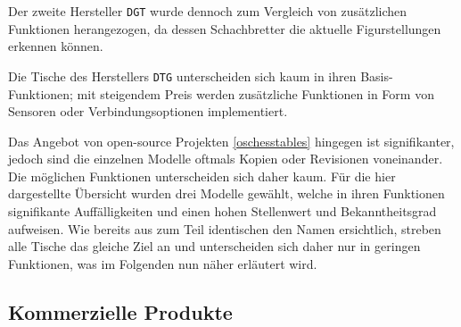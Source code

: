 Der zweite Hersteller \passthrough{\lstinline!DGT!} wurde dennoch zum
Vergleich von zusätzlichen Funktionen herangezogen, da dessen
Schachbretter die aktuelle Figurstellungen erkennen können.

Die Tische des Herstellers \passthrough{\lstinline!DTG!} unterscheiden
sich kaum in ihren Basis-Funktionen; mit steigendem Preis werden
zusätzliche Funktionen in Form von Sensoren oder Verbindungsoptionen
implementiert.

Das Angebot von open-source Projekten \ref{oschesstables} hingegen ist
signifikanter, jedoch sind die einzelnen Modelle oftmals Kopien oder
Revisionen voneinander. Die möglichen Funktionen unterscheiden sich
daher kaum. Für die hier dargestellte Übersicht wurden drei Modelle
gewählt, welche in ihren Funktionen signifikante Auffälligkeiten und
einen hohen Stellenwert und Bekanntheitsgrad aufweisen. Wie bereits aus
zum Teil identischen den Namen ersichtlich, streben alle Tische das
gleiche Ziel an und unterscheiden sich daher nur in geringen Funktionen,
was im Folgenden nun näher erläutert wird.

\hypertarget{kommerzielle-produkte}{%
\subsection{Kommerzielle Produkte}\label{kommerzielle-produkte}}

